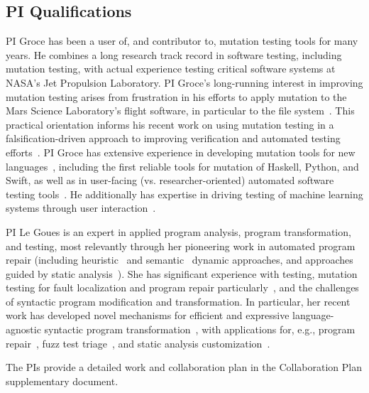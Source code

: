 \subsection{PI Qualifications}

PI Groce has been a user of, and contributor to, mutation testing tools for many
years.  He combines a long research track record in software testing, including
mutation testing, with actual experience testing critical software systems at
NASA's Jet Propulsion Laboratory.  PI Groce's long-running interest in improving
mutation testing arises from frustration in his efforts to apply mutation to the
Mars Science Laboratory's flight software, in particular to the file
system~\cite{ICSEDiff,CFV08,AMAI}.  This practical orientation informs his
recent work on using mutation testing in a falsification-driven approach to
improving verification and automated testing
efforts~\cite{groce2015verified,groce2018verified,mutKernel}.  PI Groce has
extensive experience in developing mutation tools for new
languages~\cite{le2014mucheck,muupi,regexpMut}, including the first reliable
tools for mutation of Haskell, Python, and Swift, as well as in user-facing
(vs. researcher-oriented) automated software testing
tools~\cite{tstlsttt,DeepState}.  He additionally has expertise in driving
testing of machine learning systems through user
interaction~\cite{EndUserMistake,OnlyOracle}. 

PI Le Goues is an expert in applied program analysis, program transformation,
and testing, most relevantly through her pioneering work in automated program
repair (including heuristic~\cite{legouesNFWTSE2012} and
semantic~\cite{s3,Ke15ase} dynamic approaches, and approaches guided by
static analysis~\cite{footpatch}).  She has significant experience
with testing, mutation testing for fault localization and program repair
particularly~\cite{ssbse}, and the challenges of syntactic program
modification and transformation.  In particular, her recent work has developed
novel mechanisms for efficient and expressive language-agnostic syntactic
program transformation~\cite{rvt-ppc}, with applications for, e.g., program
repair~\cite{footpatch}, fuzz test triage~\cite{vantonder-ase18}, and static analysis
customization~\cite{icse-underreview}.  

The PIs provide a detailed work and collaboration plan in the Collaboration Plan
supplementary document.